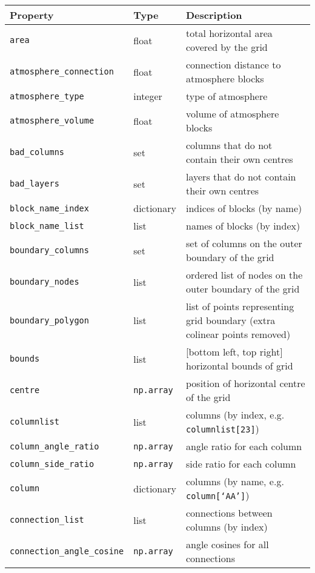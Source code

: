 \begin{center}
  \begin{longtable}{|l|l|p{75mm}|}
    \hline
    \textbf{Property} & \textbf{Type} & \textbf{Description}\\
    \hline
    \texttt{area} & float & total horizontal area covered by the grid \\
    \texttt{atmosphere\_connection} & float & connection distance to atmosphere blocks\\
    \texttt{atmosphere\_type} & integer & type of atmosphere\\
    \texttt{atmosphere\_volume} & float & volume of atmosphere blocks\\
    \texttt{bad\_columns} & set & columns that do not contain their own centres\\
    \texttt{bad\_layers} & set & layers that do not contain their own centres\\
    \texttt{block\_name\_index} & dictionary & indices of blocks (by name)\\
    \texttt{block\_name\_list} & list & names of blocks (by index)\\
    \texttt{boundary\_columns} & set & set of columns on the outer boundary of the grid \\
    \texttt{boundary\_nodes} & list & ordered list of nodes on the outer boundary of the grid \\
    \texttt{boundary\_polygon} & list & list of points representing grid boundary (extra colinear points removed) \\
    \texttt{bounds} & list & [bottom left, top right] horizontal bounds of grid\\
    \texttt{centre} & \texttt{np.array} & position of horizontal centre of the grid \\
    \texttt{columnlist} & list & columns (by index, e.g. \texttt{columnlist[23]})\\
    \texttt{column\_angle\_ratio} & \texttt{np.array} & angle ratio for each column\\
    \texttt{column\_side\_ratio} & \texttt{np.array} & side ratio for each column\\
    \texttt{column} & dictionary & columns (by name, e.g. \texttt{column[`AA']})\\
    \texttt{connection\_list} & list & connections between columns (by index)\\
    \texttt{connection\_angle\_cosine} & \texttt{np.array} & angle cosines for all connections\\

\end{longtable}
\end{center}
